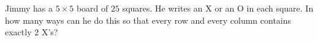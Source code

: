 Jimmy has a $5\times5$ board of $25$ squares. He writes an X or an O in each square. In how many ways can he do this so that every row and every column contains exactly $2$ X's?
